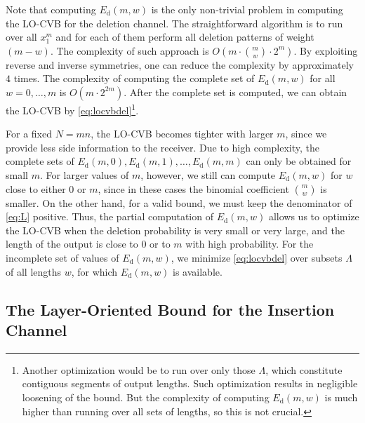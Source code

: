 \documentclass[journal, twocol]{IEEEtran}
\newcommand{\Ed}{{E_{\text{d}}}}
\newcommand{\br}[1]{{\left({#1}\right)}}
\begin{document}
Note that computing $\Ed(m,w)$ is the only non-trivial problem in computing the LO-CVB for the deletion channel.
The straightforward algorithm is to run over all $x_1^m$ and for each of them perform all deletion patterns of weight $(m-w)$.
The complexity of such approach is $O\br{ m\cdot \binom{m}{w} \cdot 2^m}$.
By exploiting reverse and inverse symmetries, one can reduce the complexity by approximately $4$ times.
The complexity of computing the complete set of $\Ed(m,w)$ for all $w=0,\dots,m$ is $O(m\cdot 2^{2m})$.
After the complete set is computed, we can obtain the LO-CVB by \eqref{eq:locvbdel}\footnote{Another optimization would be to run over only those $\Lambda$, which constitute contiguous segments of output lengths. 
Such optimization results in negligible loosening of the bound. 
But the complexity of computing $\Ed(m,w)$ is much higher than running over all sets of lengths, so this is not crucial.\label{ft:opt}}.

For a fixed $N=mn$, the LO-CVB becomes tighter with larger $m$, since we provide less side information to the receiver.
Due to high complexity, the complete sets of $\Ed(m,0), \Ed(m,1), \dots, \Ed(m,m)$ can only be obtained for small $m$.
For larger values of $m$, however, we still can compute $\Ed(m,w)$ for $w$ close to either $0$ or $m$, since in these cases the binomial coefficient $\binom{m}{w}$ is smaller.
On the other hand, for a valid bound, we must keep the denominator of \eqref{eq:L} positive.
Thus, the partial computation of $\Ed(m,w)$ allows us to optimize the LO-CVB when the deletion probability is very small or very large, and the length of the output is close to $0$ or to $m$ with high probability.
For the incomplete set of values of $\Ed(m,w)$, we minimize \eqref{eq:locvbdel} over subsets $\Lambda$ of all lengths $w$, for which $\Ed(m,w)$ is available.

\subsection{The Layer-Oriented Bound for the Insertion Channel}
\end{document}
